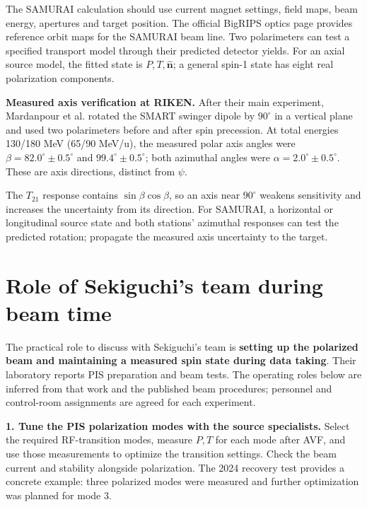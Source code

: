 \documentclass[11pt,a4paper]{article}
\newcommand{\src}[2]{~\cite[#2]{#1}}
\begin{document}
The SAMURAI calculation should use current magnet settings, field maps, beam energy, apertures and target position. The official BigRIPS optics page provides reference orbit maps for the SAMURAI beam line. Two polarimeters can test a specified transport model through their predicted detector yields. For an axial source model, the fitted state is $P,T,\hat{\bm n}$; a general spin-1 state has eight real polarization components.\src{BigRIPSOptics}{SAMURAI Beam Line entries}

\textbf{Measured axis verification at RIKEN.} After their main experiment, Mardanpour et al. rotated the SMART swinger dipole by $90^\circ$ in a vertical plane and used two polarimeters before and after spin precession. At total energies 130/180 MeV (65/90 MeV/u), the measured polar axis angles were $\beta=82.0^\circ\pm0.5^\circ$ and $99.4^\circ\pm0.5^\circ$; both azimuthal angles were $\alpha=2.0^\circ\pm0.5^\circ$. These are axis directions, distinct from $\psi$.\src{Mardanpour2007}{arXiv v2 PDF p. 5}

The $T_{21}$ response contains $\sin\beta\cos\beta$, so an axis near $90^\circ$ weakens sensitivity and increases the uncertainty from its direction. For SAMURAI, a horizontal or longitudinal source state and both stations' azimuthal responses can test the predicted rotation; propagate the measured axis uncertainty to the target.\src{Mardanpour2007}{PDF pp. 2, 5, Eq. (1)}

\clearpage
\section{Role of Sekiguchi's team during beam time}
The practical role to discuss with Sekiguchi's team is \textbf{setting up the polarized beam and maintaining a measured spin state during data taking}. Their laboratory reports PIS preparation and beam tests. The operating roles below are inferred from that work and the published beam procedures; personnel and control-room assignments are agreed for each experiment.\src{SekiguchiLab2025}{PDF p. 1 / printed p. 370, Research Activity}

\textbf{1. Tune the PIS polarization modes with the source specialists.}
Select the required RF-transition modes, measure $P,T$ for each mode after AVF, and use those measurements to optimize the transition settings. Check the beam current and stability alongside polarization. The 2024 recovery test provides a concrete example: three polarized modes were measured and further optimization was planned for mode 3.\src{Sugahara2025}{PDF p. 1, Table 2 and following paragraph}
\end{document}
